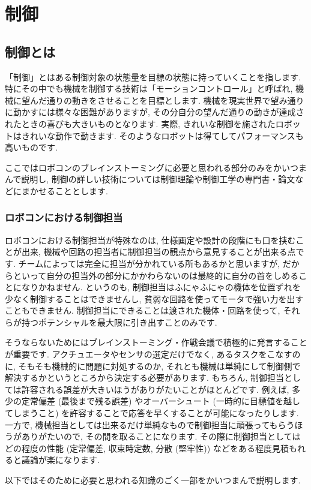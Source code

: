 \chapter{制御}
\section{制御とは}
「制御」とはある制御対象の状態量を目標の状態に持っていくことを指します. 
特にその中でも機械を制御する技術は「モーションコントロール」と呼ばれ, 
機械に望んだ通りの動きをさせることを目標とします. 
機械を現実世界で望み通りに動かすには様々な困難がありますが, 
その分自分の望んだ通りの動きが達成されたときの喜びも大きいものとなります. 
実際, きれいな制御を施されたロボットはきれいな動作で動きます. 
そのようなロボットは得てしてパフォーマンスも高いものです. 
\par
ここではロボコンのブレインストーミングに必要と思われる部分のみをかいつまんで説明し, 
制御の詳しい技術については制御理論や制御工学の専門書・論文などにまかせることとします. 

\subsection{ロボコンにおける制御担当}
ロボコンにおける制御担当が特殊なのは, 仕様画定や設計の段階にも口を挟むことが出来, 機械や回路の担当者に制御担当の観点から意見することが出来る点です. 
チームによっては完全に担当が分かれている所もあるかと思いますが, だからといって自分の担当外の部分にかかわらないのは最終的に自分の首をしめることになりかねません. 
というのも, 制御担当はふにゃふにゃの機体を位置ずれを少なく制御することはできませんし, 貧弱な回路を使ってモータで強い力を出すこともできません. 
制御担当にできることは渡された機体・回路を使って, それらが持つポテンシャルを最大限に引き出すことのみです. 
\par
そうならないためにはブレインストーミング・作戦会議で積極的に発言することが重要です. 
アクチュエータやセンサの選定だけでなく, あるタスクをこなすのに, そもそも機械的に問題に対処するのか, それとも機械は単純にして制御側で解決するかというところから決定する必要があります. 
もちろん, 制御担当としては許容される誤差が大きいほうがありがたいことがほとんどです. 
例えば, 多少の定常偏差 (最後まで残る誤差) やオーバーシュート (一時的に目標値を越してしまうこと) を許容することで応答を早くすることが可能になったりします. 
一方で, 機械担当としては出来るだけ単純なもので制御担当に頑張ってもらうほうがありがたいので, その間を取ることになります. 
その際に制御担当としてはどの程度の性能 (定常偏差, 収束時定数, 分散 (堅牢性)) などをある程度見積もれると議論が楽になります. 
\par
以下ではそのために必要と思われる知識のごく一部をかいつまんで説明します. 


